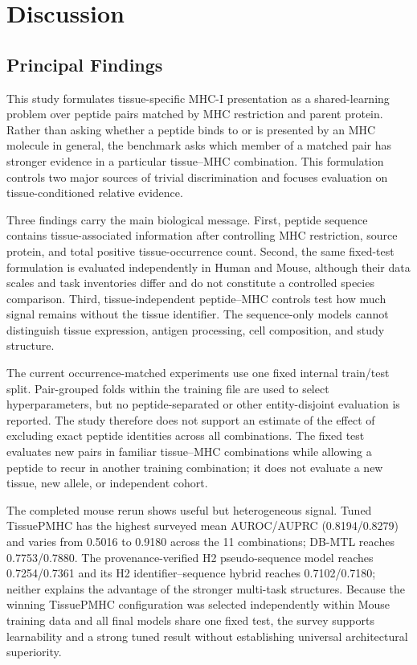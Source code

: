 \section{Discussion}

\subsection{Principal Findings}

This study formulates tissue-specific MHC-I presentation as a shared-learning problem over peptide pairs matched by MHC restriction and parent protein. Rather than asking whether a peptide binds to or is presented by an MHC molecule in general, the benchmark asks which member of a matched pair has stronger evidence in a particular tissue--MHC combination. This formulation controls two major sources of trivial discrimination and focuses evaluation on tissue-conditioned relative evidence.

Three findings carry the main biological message. First, peptide sequence contains tissue-associated information after controlling MHC restriction, source protein, and total positive tissue-occurrence count. Second, the same fixed-test formulation is evaluated independently in Human and Mouse, although their data scales and task inventories differ and do not constitute a controlled species comparison. Third, tissue-independent peptide--MHC controls test how much signal remains without the tissue identifier. The sequence-only models cannot distinguish tissue expression, antigen processing, cell composition, and study structure.

The current occurrence-matched experiments use one fixed internal train/test split. Pair-grouped folds within the training file are used to select hyperparameters, but no peptide-separated or other entity-disjoint evaluation is reported. The study therefore does not support an estimate of the effect of excluding exact peptide identities across all combinations. The fixed test evaluates new pairs in familiar tissue--MHC combinations while allowing a peptide to recur in another training combination; it does not evaluate a new tissue, new allele, or independent cohort.

The completed mouse rerun shows useful but heterogeneous signal. Tuned TissuePMHC has the highest surveyed mean AUROC/AUPRC (0.8194/0.8279) and varies from 0.5016 to 0.9180 across the 11 combinations; DB-MTL reaches 0.7753/0.7880. The provenance-verified H2 pseudo-sequence model reaches 0.7254/0.7361 and its H2 identifier--sequence hybrid reaches 0.7102/0.7180; neither explains the advantage of the stronger multi-task structures. Because the winning TissuePMHC configuration was selected independently within Mouse training data and all final models share one fixed test, the survey supports learnability and a strong tuned result without establishing universal architectural superiority.

